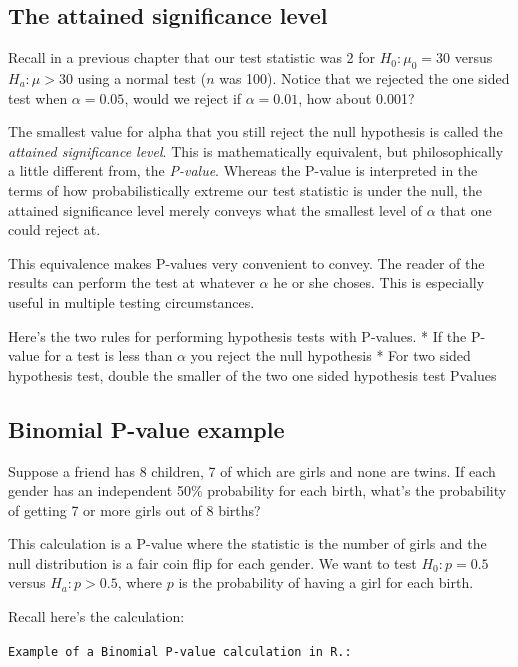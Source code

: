 \documentclass[]{article}
\begin{document}
\subsection{The attained significance
level}\label{the-attained-significance-level}

Recall in a previous chapter that our test statistic was 2 for
$H_0 : \mu_0  = 30$ versus $H_a:\mu > 30$ using a normal test ($n$ was
100). Notice that we rejected the one sided test when $\alpha = 0.05$,
would we reject if $\alpha = 0.01$, how about 0.001?

The smallest value for alpha that you still reject the null hypothesis
is called the \emph{attained significance level}. This is mathematically
equivalent, but philosophically a little different from, the
\emph{P-value}. Whereas the P-value is interpreted in the terms of how
probabilistically extreme our test statistic is under the null, the
attained significance level merely conveys what the smallest level of
$\alpha$ that one could reject at.

This equivalence makes P-values very convenient to convey. The reader of
the results can perform the test at whatever $\alpha$ he or she choses.
This is especially useful in multiple testing circumstances.

Here's the two rules for performing hypothesis tests with P-values. * If
the P-value for a test is less than $\alpha$ you reject the null
hypothesis * For two sided hypothesis test, double the smaller of the
two one sided hypothesis test Pvalues

\subsection{Binomial P-value example}\label{binomial-p-value-example}

Suppose a friend has 8 children, 7 of which are girls and none are
twins. If each gender has an independent 50\% probability for each
birth, what's the probability of getting 7 or more girls out of 8
births?

This calculation is a P-value where the statistic is the number of girls
and the null distribution is a fair coin flip for each gender. We want
to test $H_0: p=0.5$ versus $H_a: p > 0.5$, where $p$ is the probability
of having a girl for each birth.

Recall here's the calculation:

\vspace{1pc}

\verb;Example of a Binomial P-value calculation in R.:;
\end{document}
